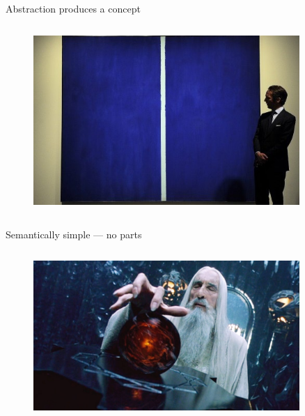 \documentclass[xcolor=dvipsnames]{beamer}
\begin{document}
\begin{frame}[fragile]{Abstraction produces a concept}
  \begin{columns}[T] %
    \begin{column}{0.99\textwidth}
      \begin{figure}[H]
        \centering
        \includegraphics[width=0.9\textwidth]{abstract}
      \end{figure}
    \end{column}%
  \end{columns}
\end{frame}


\begin{frame}[fragile]{Semantically simple --- no parts}
  \begin{columns}[T] %
    \begin{column}{0.99\textwidth}
      \begin{figure}[H]
        \centering
        \includegraphics[width=0.9\textwidth]{crystal-ball}
      \end{figure}
    \end{column}%
  \end{columns}
\end{frame}
\end{document}
